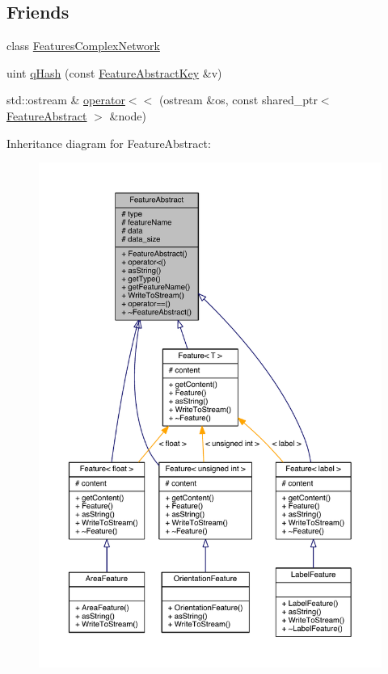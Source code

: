\subsection*{Friends}
\begin{DoxyCompactItemize}
\item 
class \hyperlink{class_feature_abstract_ac83197c9714439d51f43440c042625e7}{Features\+Complex\+Network}
\item 
uint \hyperlink{class_feature_abstract_aca59f644613693185e40001464f20995}{q\+Hash} (const \hyperlink{class_feature_abstract_key}{Feature\+Abstract\+Key} \&v)
\item 
std\+::ostream \& \hyperlink{class_feature_abstract_a3266c282d48b8f922e50ea489fc3a667}{operator$<$$<$} (ostream \&os, const shared\+\_\+ptr$<$ \hyperlink{class_feature_abstract}{Feature\+Abstract} $>$ \&node)
\end{DoxyCompactItemize}


Inheritance diagram for Feature\+Abstract\+:
\nopagebreak
\begin{figure}[H]
\begin{center}
\leavevmode
\includegraphics[width=350pt]{class_feature_abstract__inherit__graph}
\end{center}
\end{figure}


